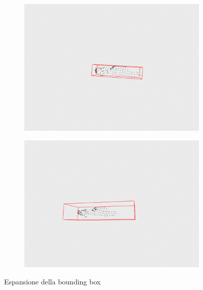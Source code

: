 \documentclass[italian]{article}
\begin{document}
\begin{figure}[H]
	\centering
	\begin{subfigure}{0.45\textwidth}
		\includegraphics[width=\textwidth]{notExpandedBox}
	\end{subfigure}
	\begin{subfigure}{0.45\textwidth}
		\includegraphics[width=\textwidth]{expandedBox}
	\end{subfigure}
	\footnotesize
	\caption{Espansione della bounding box}
\end{figure}
\end{document}
